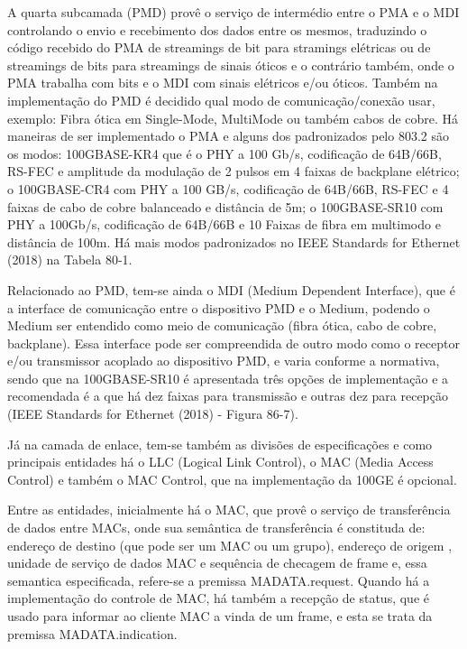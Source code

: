 \documentclass[a4paper,12pt]{article}
\begin{document}
A quarta subcamada (PMD) provê o serviço de intermédio entre o PMA e o MDI controlando o envio e recebimento dos dados entre os mesmos, traduzindo o código recebido do PMA de streamings de bit para stramings elétricas ou de streamings de bits para streamings de sinais óticos e o contrário também, onde o PMA trabalha com bits e o MDI com sinais elétricos e/ou óticos. Também na implementação do PMD é decidido qual modo de comunicação/conexão usar, exemplo: Fibra ótica em Single-Mode, MultiMode ou também cabos de cobre. Há maneiras de ser implementado o PMA e alguns dos padronizados pelo 803.2 são os modos: 100GBASE-KR4 que é o PHY a 100 Gb/s, codificação de 64B/66B, RS-FEC e amplitude da modulação de 2 pulsos em 4 faixas de backplane elétrico; o 100GBASE-CR4 com PHY a 100 GB/s, codificação de 64B/66B, RS-FEC e 4 faixas de cabo de cobre balanceado e distância de 5m; o 100GBASE-SR10 com PHY a 100Gb/s, codificação de 64B/66B e 10 Faixas de fibra em multimodo e distância de 100m. Há mais modos padronizados no IEEE Standards for Ethernet (2018) na Tabela 80-1.

Relacionado ao PMD, tem-se ainda o MDI (Medium Dependent Interface), que é a interface de comunicação entre o dispositivo PMD e o Medium, podendo o Medium ser entendido como meio de comunicação (fibra ótica, cabo de cobre, backplane). Essa interface pode ser compreendida de outro modo como o receptor e/ou transmissor acoplado ao dispositivo PMD, e varia conforme a normativa, sendo que na 100GBASE-SR10 é apresentada três opções de implementação e a recomendada é a que há dez faixas para transmissão e outras dez para recepção (IEEE Standards for Ethernet (2018) - Figura 86-7).

Já na camada de enlace, tem-se também as divisões de especificações e como principais entidades há o LLC (Logical Link Control), o MAC (Media Access Control) e também o MAC Control, que na implementação da 100GE é opcional.

Entre as entidades, inicialmente há o MAC, que provê o serviço de transferência de dados entre MACs, onde sua semântica de transferência é constituda de: endereço de destino (que pode ser um MAC ou um grupo), endereço de origem , unidade de serviço de dados MAC e sequência de checagem de frame e, essa semantica especificada, refere-se a premissa MA\underline{\hspace*{0.14in}}DATA.request. Quando há a implementação do controle de MAC, há também a recepção de status, que é usado para informar ao cliente MAC a vinda de um frame, e esta se trata da premissa MA\underline{\hspace*{0.14in}}DATA.indication.
\end{document}
